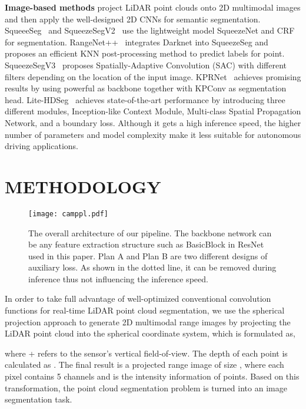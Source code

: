 \documentclass{article}
\begin{document}
\noindent\textbf{Image-based methods} project LiDAR point clouds onto 2D multimodal images and then apply the well-designed 2D CNNs for semantic segmentation. SqueeeSeg~\cite{wu2018squeezeseg} and SqueezeSegV2~\cite{wu2019squeezesegv2} use the lightweight model SqueezeNet and CRF for segmentation. RangeNet++~\cite{milioto2019rangenet++} integrates Darknet into SqueezeSeg and proposes an efficient KNN post-processing method to predict labels for point. SqueezeSegV3~\cite{xu2020squeezesegv3} proposes Spatially-Adaptive Convolution (SAC) with different filters depending on the location of the input image. KPRNet~\cite{kochanov2020kprnet} achieves promising results by using powerful as backbone together with KPConv as segmentation head. Lite-HDSeg~\cite{Lite-HDSeg} achieves state-of-the-art performance by introducing three different modules, Inception-like Context Module, Multi-class Spatial Propagation Network, and a boundary loss. Although it gets a high inference speed, the higher number of parameters and model complexity make it less suitable for autonomous driving applications. 


\section{METHODOLOGY}
\label{sec:method}
\begin{figure*}[t]
\centering
\texttt{[image: camppl.pdf]}
\vspace{-5mm}
\caption{The overall architecture of our pipeline. The backbone network can be any feature extraction structure such as BasicBlock in ResNet used in this paper. Plan A and Plan B are two different designs of auxiliary loss. As shown in the dotted line, it can be removed during inference thus not influencing the inference speed.}
\label{fig:framework}
\vspace{-6mm}
\end{figure*}

In order to take full advantage of well-optimized conventional convolution functions for real-time LiDAR point cloud segmentation, we use the spherical projection approach to generate 2D multimodal range images by projecting the LiDAR point cloud into the spherical coordinate system, which is formulated as, 
\vspace{-1.5ex}


where  +  refers to the sensor's vertical field-of-view. The depth  of each point is calculated as .
The final result is a projected range image of size , where each pixel contains 5 channels  and  is the intensity information of points. Based on this transformation, the point cloud segmentation problem is turned into an image segmentation task.
\end{document}
